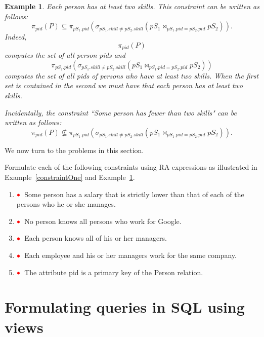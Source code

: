 \documentclass[11pt]{article}
\newcommand{\red}[1]{{\color{red}#1}}
\newcommand{\redbullet}{$\red{\bullet}$}
\newtheorem{example}{Example}
\begin{document}
\begin{example}\label{constraintTwo}
\emph{Each person has at least two skills}.   This constraint can be written as follows:
\[\pi_{pid}(P) \subseteq \pi_{pS_1.pid}(\sigma_{pS_1.skill \neq pS_2.skill}(pS_1\bowtie_{pS_1.pid = pS_2.pid} pS_2)).
\]
Indeed, \[\pi_{pid}(P)\] computes the set of all person pids and
\[\pi_{pS_1.pid}(\sigma_{pS_1.skill \neq pS_2.skill}(pS_1\bowtie_{pS_1.pid = pS_2.pid} pS_2))\] computes the set of
all pids of persons who have at least two skills.    When the first set is contained in the second we must have that each person has at least two skills.

Incidentally, the constraint ``\emph{Some person has fewer than two skills}" can be written as follows:
\[\pi_{pid}(P) \not\subseteq \pi_{pS_1.pid}(\sigma_{pS_1.skill \neq pS_2.skill}(pS_1\bowtie_{pS_1.pid = pS_2.pid} pS_2)).
\]

\end{example}

We now turn to the problems in this section.

Formulate each of the following constraints using RA expressions as illustrated in Example~\ref{constraintOne} and
Example~\ref{constraintTwo}.

\begin{enumerate}[resume]


\item \redbullet\  Some person has a salary that is strictly lower than that of each of the persons who he or she manages.

\item \redbullet\ No person knows all persons who work for Google.

\item \redbullet\  Each person knows all of his or her managers.

\item \redbullet\  Each employee and his or her managers work for the same company.

\item \redbullet\  The attribute pid is a primary key of the Person relation.

\end{enumerate}




\newpage

\section{Formulating queries in SQL using views}
\end{document}
